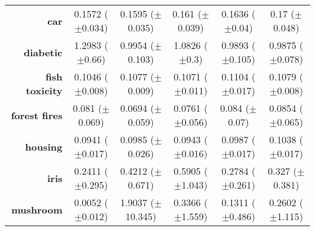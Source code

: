 \begin{table}[htb]
{\begin{tabular}{r|ccccc}
                  \textbf{car}                 & \cellcolor[rgb]{ .388,  .745,  .482}0.1572 ($\pm$0.034)     & \cellcolor[rgb]{ .757,  .851,  .502}0.1595 ($\pm$0.035) & \cellcolor[rgb]{ 1,  .922,  .518}0.161 ($\pm$0.039)     & \cellcolor[rgb]{ .992,  .773,  .49}0.1636 ($\pm$0.04)  & \cellcolor[rgb]{ .973,  .412,  .42}0.17 ($\pm$0.048)    \\
                  \textbf{diabetic}            & \cellcolor[rgb]{ .973,  .412,  .42}1.2983 ($\pm$0.66)       & \cellcolor[rgb]{ 1,  .922,  .518}0.9954 ($\pm$0.103)    & \cellcolor[rgb]{ .992,  .776,  .49}1.0826 ($\pm$0.3)    & \cellcolor[rgb]{ .525,  .784,  .49}0.9893 ($\pm$0.105) & \cellcolor[rgb]{ .388,  .745,  .482}0.9875 ($\pm$0.078) \\
                  \textbf{fish toxicity}       & \cellcolor[rgb]{ .388,  .745,  .482}0.1046 ($\pm$0.008)     & \cellcolor[rgb]{ 1,  .922,  .518}0.1077 ($\pm$0.009)    & \cellcolor[rgb]{ .882,  .886,  .51}0.1071 ($\pm$0.011)  & \cellcolor[rgb]{ .973,  .412,  .42}0.1104 ($\pm$0.017) & \cellcolor[rgb]{ 1,  .886,  .514}0.1079 ($\pm$0.008)    \\
                  \textbf{forest fires}        & \cellcolor[rgb]{ 1,  .922,  .518}0.081 ($\pm$0.069)         & \cellcolor[rgb]{ .388,  .745,  .482}0.0694 ($\pm$0.059) & \cellcolor[rgb]{ .737,  .843,  .502}0.0761 ($\pm$0.056) & \cellcolor[rgb]{ .984,  .569,  .451}0.084 ($\pm$0.07)  & \cellcolor[rgb]{ .973,  .412,  .42}0.0854 ($\pm$0.065)  \\
                  \textbf{housing}             & \cellcolor[rgb]{ .388,  .745,  .482}0.0941 ($\pm$0.017)     & \cellcolor[rgb]{ 1,  .922,  .518}0.0985 ($\pm$0.026)    & \cellcolor[rgb]{ .412,  .749,  .482}0.0943 ($\pm$0.016) & \cellcolor[rgb]{ 1,  .906,  .518}0.0987 ($\pm$0.017)   & \cellcolor[rgb]{ .973,  .412,  .42}0.1038 ($\pm$0.017)  \\
                  \textbf{iris}                & \cellcolor[rgb]{ .388,  .745,  .482}0.2411 ($\pm$0.295)     & \cellcolor[rgb]{ .992,  .741,  .486}0.4212 ($\pm$0.671) & \cellcolor[rgb]{ .973,  .412,  .42}0.5905 ($\pm$1.043)  & \cellcolor[rgb]{ .651,  .82,  .494}0.2784 ($\pm$0.261) & \cellcolor[rgb]{ 1,  .922,  .518}0.327 ($\pm$0.381)     \\
                  \textbf{mushroom}            & \cellcolor[rgb]{ .388,  .745,  .482}0.0052 ($\pm$0.012)     & \cellcolor[rgb]{ .973,  .412,  .42}1.9037 ($\pm$10.345) & \cellcolor[rgb]{ 1,  .898,  .514}0.3366 ($\pm$1.559)    & \cellcolor[rgb]{ .69,  .831,  .498}0.1311 ($\pm$0.486) & \cellcolor[rgb]{ 1,  .922,  .518}0.2602 ($\pm$1.115)    \\

\end{tabular}}
\end{table}

